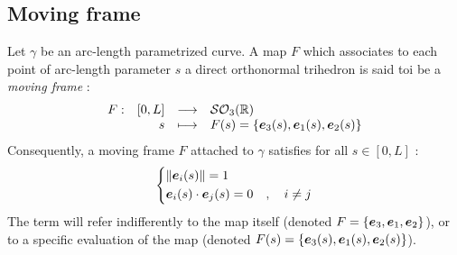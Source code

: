 \subsection{Moving frame}

Let $\gamma$ be an arc-length parametrized curve. A map $F$ which associates to each point of arc-length parameter $s$ a direct orthonormal trihedron is said toi be a \emph{moving frame} :
\begin{equation}
	\begin{array}{lrcl} F: & [0,L] & \longrightarrow & \mathcal{SO}_{3}(\mathbb{R}) \\ & s & \longmapsto & F(s) = \{\boldsymbol{e}_{3}(s),\boldsymbol{e}_{1}(s),\boldsymbol{e}_{2}(s)\} \end{array}
\end{equation}
Consequently, a moving frame $F$ attached to $\gamma$ satisfies for all $s \in [0,L]$ :
\begin{equation}
	\left\{
	\begin{aligned}
		& \lVert\boldsymbol{e}_i(s)\rVert = 1 \\
		& \boldsymbol{e}_i(s) \cdot \boldsymbol{e}_j(s) = 0\quad , \quad i \neq j
	\end{aligned}
	\right.
\end{equation}
The term  will refer indifferently to the map itself (denoted $F=\{\boldsymbol{e}_{3},\boldsymbol{e}_{1},\boldsymbol{e}_{2}\}$), or to a specific evaluation of the map (denoted $F(s)=\{\boldsymbol{e}_{3}(s),\boldsymbol{e}_{1}(s),\boldsymbol{e}_{2}(s)\}$).


